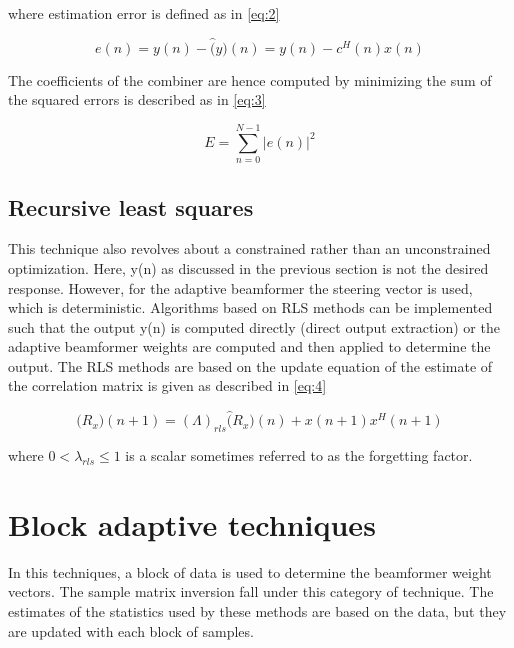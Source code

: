 where estimation error is defined as in \ref{eq:2}

\begin{equation} \label{eq:2}
e(n) = y(n) - \hat(y)(n) = y(n) - c^{H}(n)x(n)
\end{equation}

The coefficients of the combiner are hence computed by minimizing the sum of the
squared errors is described as in \ref{eq:3}

\begin{equation} \label{eq:3}
E = \sum_{n=0}^{N-1} |e(n)|^{2}
\end{equation}


\subsection{Recursive least squares}
This technique also revolves about a constrained rather than an unconstrained optimization. Here, y(n) as discussed in the previous section is not the desired response. However, for the adaptive beamformer the steering vector is used, which is deterministic. Algorithms based on RLS methods can be implemented such that the output y(n) is computed directly (direct output extraction) or the adaptive beamformer weights are computed and then applied to determine the output. The RLS methods are based on the update equation of the estimate of the correlation matrix is given as described in \ref{eq:4}

\begin{equation} \label{eq:4}
\hat(R_{x})(n+1) = (\Lambda)_{rls}\hat(R_{x})(n) + x(n+1)x^{H}(n+1)
\end{equation}


where $0 < \lambda_{rls} \le 1$ is a scalar sometimes referred to as the forgetting factor.\vspace{0.75cm}

\section{Block adaptive techniques}
In this techniques, a block of data is used to determine the beamformer weight vectors. The sample matrix inversion fall under this category of technique. The estimates of the statistics used by these methods are based on the data, but they are updated with each block of samples.

